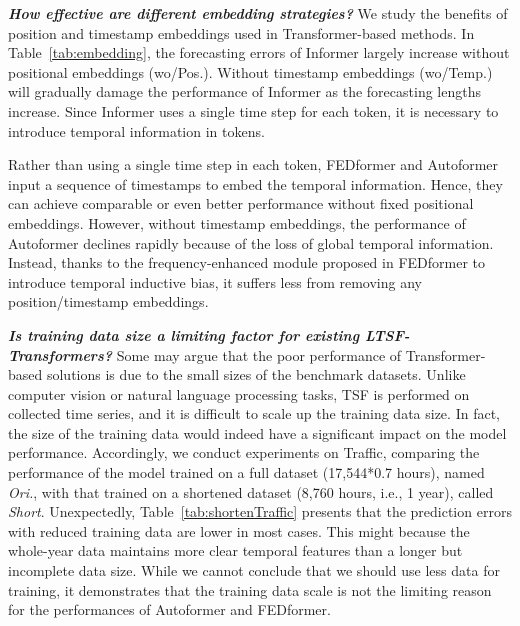 \documentclass[10pt,twocolumn,letterpaper]{article}
\begin{document}
            

\textbf{\emph{How effective are different embedding strategies?}}
We study the benefits of position and timestamp embeddings used in Transformer-based methods. 
In Table~\ref{tab:embedding}, the forecasting errors of Informer largely increase without positional embeddings (wo/Pos.). Without timestamp embeddings (wo/Temp.) will gradually damage the performance of Informer as the forecasting lengths increase. 
Since Informer uses a single time step for each token, it is necessary to introduce temporal information in tokens.

Rather than using a single time step in each token, FEDformer and Autoformer input a sequence of timestamps to embed the temporal information. 
Hence, they can achieve comparable or even better performance without fixed positional embeddings. However, without timestamp embeddings, the performance of Autoformer declines rapidly because of the loss of global temporal information. Instead, thanks to the frequency-enhanced module proposed in FEDformer to introduce temporal inductive bias, it suffers less from removing any position/timestamp embeddings. 




\textbf{\emph{Is training data size a limiting factor for existing LTSF-Transformers?}}
Some may argue that the poor performance of Transformer-based solutions is due to the small sizes of the benchmark datasets. 
Unlike computer vision or natural language processing tasks, TSF is performed on collected time series, and it is difficult to scale up the training data size. In fact, the size of the training data would indeed have a significant impact on the model performance. Accordingly, we conduct experiments on Traffic, comparing the performance of the model trained on a full dataset (17,544*0.7 hours), named \emph{Ori.}, with that trained on a shortened dataset (8,760 hours, i.e., 1 year), called \emph{Short}. Unexpectedly, Table~\ref{tab:shortenTraffic} presents that the prediction errors with reduced training data are lower in most cases. This might because the whole-year data maintains more clear temporal features than a longer but incomplete data size. While we cannot conclude that we should use less data for training, it demonstrates that the training data scale is not the limiting reason for the performances of Autoformer and FEDformer. 
\end{document}
